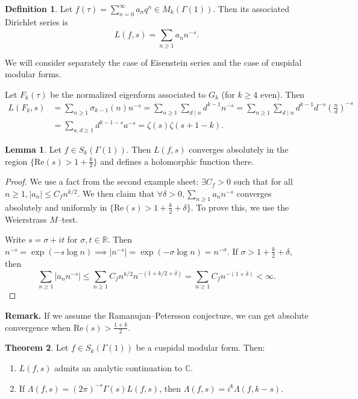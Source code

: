 \documentclass{article}
\theoremstyle{definition}
\newtheorem{theorem}{Theorem}[section]
\newtheorem{lemma}[theorem]{Lemma}
\newtheorem{defn}{Definition}[section]
\begin{document}
\begin{defn}
    Let $f(\tau) = \sum_{n=0}^{\infty} a_nq^n \in M_k(\Gamma(1))$. Then its associated Dirichlet series is  \[
    L(f,s) = \sum_{n\ge 1}^{} a_n n^{-s}.
    \]
\end{defn}
We will consider separately the case of Eisenstein series and the case of cuspidal modular forms. 
\vspace{1mm}
 
Let $F_k(\tau)$ be the normalized eigenform associated to $G_k$ (for $k\ge 4$ even). Then 
\begin{align*}
    L(F_k, s) &= \sum_{n\ge 1}^{} \sigma_{k-1}(n)n^{-s} = \sum_{n\ge 1}^{} \sum_{d \mid n}^{} d^{k-1}n^{-s} = \sum_{n\ge 1}^{} \sum_{ d \mid n}^{} d^{k-1}d^{-s}\left(\frac{n}{d}\right)^{-s} \\
    &= \sum_{a,d \ge 1}^{} d^{k-1-s}a^{-s} = \zeta(s)\zeta(s+1-k).
\end{align*}
\begin{lemma}
    Let $f \in S_k(\Gamma(1))$. Then $L(f,s)$ converges absolutely in the region $\{\text{Re}(s)> 1 + \frac{k}{2}\}$ and defines a holomorphic function there.
\end{lemma}
\begin{proof}
    We use a fact from the second example sheet: $\exists C_f>0$ such that for all $n\ge 1, |a_n|\le C_f n^{k/2}$. We then claim that $\forall \delta>0, \sum_{n\ge 1}^{} a_n n^{-s}$ converges absolutely and uniformly in $\{\text{Re}(s)>1 + \frac{k}{2} + \delta\}$. To prove this, we use the Weierstrass $M$--test.
    \vspace{1mm}
     
    Write $s = \sigma + it$ for $\sigma, t \in \mathbb{R}$. Then $n^{-s} = \exp(-s \log n) \implies |n^{-s}| = \exp(-\sigma \log n) = n^{-\sigma}$. If $\sigma > 1 +\frac{k}{2} + \delta$, then $$\sum_{n\ge 1}^{} |a_n n^{-s}| \le \sum_{n\ge 1}^{} C_f n^{k/2} n^{-(1+k/2+\delta)} = \sum_{n\ge 1}^{} C_f n^{-(1+\delta)}<\infty.$$
\end{proof}
\textbf{Remark.} If we assume the Ramanujan--Petersson conjecture, we can get absolute convergence when $\text{Re}(s)>\frac{1+k}{2}$.
\begin{theorem}\label{theorem4.2}
    Let $f \in S_k(\Gamma(1))$ be a cuspidal modular form. Then:
    \begin{enumerate}[(1)]
        \item $L(f,s)$ admits an analytic continuation to $\mathbb{C}$.
        \item If $\Lambda(f,s) = (2\pi)^{-s}\Gamma(s)L(f,s)$, then $\Lambda(f,s) = i^k \Lambda(f,k-s)$.
    \end{enumerate}
\end{theorem}
\end{document}
